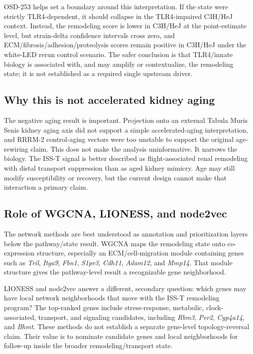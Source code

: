 \documentclass[11pt]{article}
\newcommand{\gene}[1]{\textit{#1}}
\begin{document}
OSD-253 helps set a boundary around this interpretation. If the state were strictly TLR4-dependent, it should collapse in the TLR4-impaired C3H/HeJ context. Instead, the remodeling score is lower in C3H/HeJ at the point-estimate level, but strain-delta confidence intervals cross zero, and ECM/fibrosis/adhesion/proteolysis scores remain positive in C3H/HeJ under the white-LED rerun control scenario. The safer conclusion is that TLR4/innate biology is associated with, and may amplify or contextualize, the remodeling state; it is not established as a required single upstream driver.

\subsection{Why this is not accelerated kidney aging}

The negative aging result is important. Projection onto an external Tabula Muris Senis kidney aging axis did not support a simple accelerated-aging interpretation, and RRRM-2 control-aging vectors were too unstable to support the original age-rewiring claim. This does not make the analysis uninformative. It narrows the biology. The ISS-T signal is better described as flight-associated renal remodeling with distal transport suppression than as aged kidney mimicry. Age may still modify susceptibility or recovery, but the current design cannot make that interaction a primary claim.

\subsection{Role of WGCNA, LIONESS, and node2vec}

The network methods are best understood as annotation and prioritization layers below the pathway/state result. WGCNA maps the remodeling state onto co-expression structure, especially an ECM/cell-migration module containing genes such as \gene{Tril}, \gene{Itga9}, \gene{Fbn1}, \gene{S1pr3}, \gene{Cdh11}, \gene{Adam12}, and \gene{Mmp14}. That module structure gives the pathway-level result a recognizable gene neighborhood.

LIONESS and node2vec answer a different, secondary question: which genes may have local network neighborhoods that move with the ISS-T remodeling program? The top-ranked genes include stress-response, metabolic, clock-associated, transport, and signaling candidates, including \gene{Rbm3}, \gene{Per2}, \gene{Cyp4a14}, and \gene{Bhmt}. These methods do not establish a separate gene-level topology-reversal claim. Their value is to nominate candidate genes and local neighborhoods for follow-up inside the broader remodeling/transport state.
\end{document}
